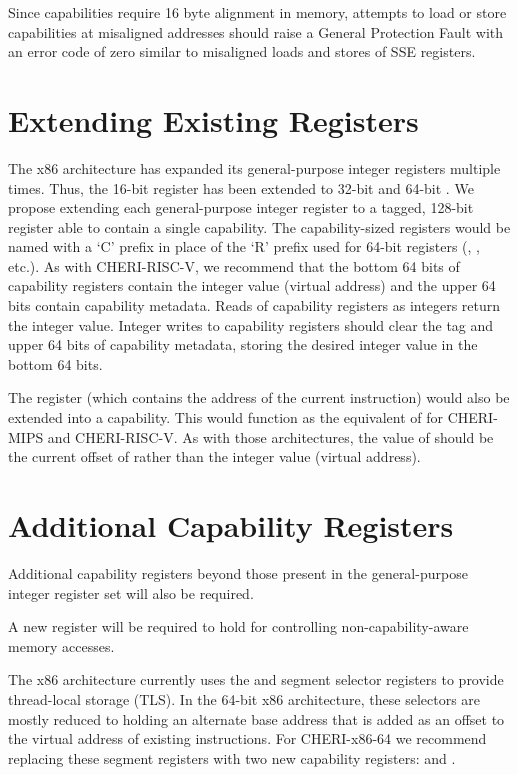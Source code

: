 Since capabilities require 16 byte alignment in memory, attempts to
load or store capabilities at misaligned addresses should raise a
General Protection Fault with an error code of zero similar to
misaligned loads and stores of SSE registers.

\section{Extending Existing Registers}

The x86 architecture has expanded its general-purpose integer registers multiple
times.  Thus, the 16-bit \AX{} register has been extended to 32-bit \EAX{}
and 64-bit \RAX{}.
We propose extending each general-purpose integer register to a tagged, 128-bit register
able to contain a single capability.
The capability-sized registers would be named with a `C' prefix in place
of the `R' prefix used for 64-bit registers
(\CAX{}, \CBX{}, etc.).
As with CHERI-RISC-V,
we recommend that the bottom 64 bits of capability registers contain
the integer value (virtual address) and the upper 64 bits contain
capability metadata.
Reads of capability registers as integers return the integer value.
Integer writes to capability registers
should clear the tag and upper 64 bits of capability metadata, storing the
desired integer value in the bottom 64 bits.

The \RIP{} register (which contains the address of the current instruction)
would also be extended into a \CIP{} capability.  This would function as
the equivalent of \PCC{} for CHERI-MIPS and CHERI-RISC-V.  As with
those architectures, the
value of \RIP{} should be the current offset of \CIP{} rather than the
integer value (virtual address).

\section{Additional Capability Registers}
\label{sec:x86:additional-caps}

Additional capability registers beyond those present in the general-purpose
integer
register set will also be required.

A new register will be required to hold \DDC{} for controlling
non-capability-aware memory accesses.

The x86 architecture currently uses the \FS{} and \GS{} segment selector registers
to provide thread-local storage (TLS).  In the 64-bit x86 architecture,
these selectors are mostly reduced to holding an alternate base address
that is added as an offset to the virtual address of existing instructions.
For CHERI-x86-64 we recommend replacing these segment registers with two
new capability registers: \CFS{} and \CGS{}.

